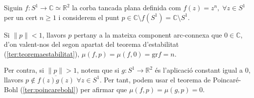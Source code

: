 \documentclass[../main.tex]{subfiles}
\begin{document}
\begin{ej}
Siguin $f:S^1\rightarrow \mathbb{C}\simeq\mathbb{R}^2$ la corba tancada plana definida com $f(z) = z^n,\;\forall z\in S^1$ per un cert $n\geq 1$ i considerem el punt $p\in \mathbb{C}\setminus f(S^1) = \mathbb{C}\setminus S^1$.

Si $\|p\|<1$, llavors $p$ pertany a la mateixa component arc-connexa que $0\in\mathbb{C}$, d'on valent-nos del segon apartat del teorema d'estabilitat (\ref{ter:teoremaestabilitat}), $\mu(f,p) = \mu(f,0)=\mathrm{gr}f = n$.

Per contra, si $\|p\|>1$, notem que si $g:S^1\rightarrow \mathbb{R}^2$ és l'aplicació constant igual a 0, llavors $p\not\in\overline{f(z)g(z)}$ $\forall z\in S^1$. Per tant, podem usar el teorema de Poincaré-Bohl (\ref{ter:poincarebohl}) per afirmar que $\mu(f,p) = \mu(g,p) = 0$.
\end{ej}
\end{document}
